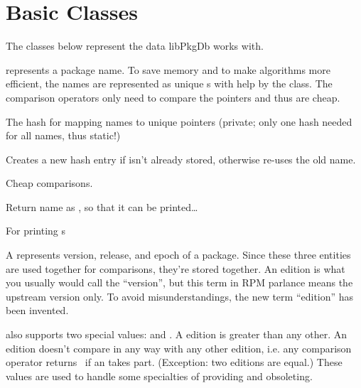 \documentclass[10pt]{article}
\begin{document}
\section{Basic Classes}
The classes below represent the data libPkgDb works with.



 represents a package name. To save memory and to make
algorithms more efficient, the names are represented as unique
s with help by the  class. The comparison
operators only need to compare the pointers and thus are cheap.

The hash for mapping names to unique pointers (private; only one hash
needed for all names, thus static!)

Creates a new hash entry if  isn't already stored, otherwise
re-uses the old name.

Cheap comparisons.

Return name as , so that it can be printed\dots

For printing s





A  represents version, release, and epoch of a
package. Since these three entities are used together for comparisons,
they're stored together. An edition is what you usually would call the
``version'', but this term in RPM parlance means the upstream version
only. To avoid misunderstandings, the new term ``edition'' has been
invented.

 also supports two special values:  and
. A  edition is greater than any other. An
 edition doesn't compare in any way with any other
edition, i.e. any comparison operator returns \false\ if an
 takes part. (Exception: two  editions are
equal.) These values are used to handle some specialties of providing
and obsoleting.
\end{document}
